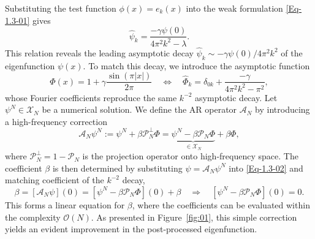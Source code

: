 \documentclass{sn-jnl}%
\numberwithin{equation}{section}
\theoremstyle{thmstyleone}%
\theoremstyle{thmstyletwo}%
\theoremstyle{thmstylethree}%
\begin{document}
Substituting the test function $\phi(x) = e_{k}(x)$ into the weak formulation \eqref{Eq-1.3-01} gives
\begin{equation}\label{Eq-1.3-02}
    \hat{\psi}_k = \frac{-\gamma\psi(0)}{4\pi^2 k^2-\lambda}.
\end{equation}
This relation reveals the leading asymptotic decay $\hat{\psi}_k \sim-\gamma\psi(0)/4\pi^2k^2$ of the eigenfunction $\psi(x)$. To match this decay, we introduce the asymptotic function
\begin{equation}\label{Eq-1.3-03}
\Phi(x) = 1+\gamma\frac{\sin(\pi|x|)}{2\pi} 
\quad\Longleftrightarrow\quad
\hat{\Phi}_k = \delta_{0k}+\frac{-\gamma}{4\pi^2k^2-\pi^2},
\end{equation}
whose Fourier coefficients reproduce the same $k^{-2}$ asymptotic decay. 
Let $\psi^N \in \mathscr{X}_N$ be a numerical solution. 
We define the AR operator $\mathcal{A}_N$ by introducing a high-frequency correction
\begin{equation}\label{Eq-1.3-04}
\mathcal{A}_N \psi^N := \psi^N + \beta \mathcal{P}_N^\perp \Phi = \underbrace{\psi^N-\beta\mathcal{P}_N\Phi}_{\in\mathscr{X}_N} +\beta\Phi,
\end{equation}
where $\mathcal{P}_N^{\perp} = 1-\mathcal{P}_N$ is the projection operator onto high-frequency space. The coefficient $\beta$ is then determined by substituting $\psi = \mathcal{A}_N \psi^N$ into \eqref{Eq-1.3-02} and matching coefficient of the $k^{-2}$ decay,
\begin{equation}\label{Eq-1.3-05}
\beta = [\mathcal{A}_N \psi](0)
= \left[\psi^N - \beta \mathcal{P}_N \Phi\right](0) + \beta
\quad \Longrightarrow \quad
\left[\psi^N - \beta \mathcal{P}_N \Phi\right](0) = 0.
\end{equation}
 This forms a linear equation for $\beta$, where the coefficients can be evaluated within the complexity $\mathcal{O}(N)$. As presented in Figure~\ref{fig:01}, this simple correction yields an evident improvement in the post-processed eigenfunction. 
\end{document}
